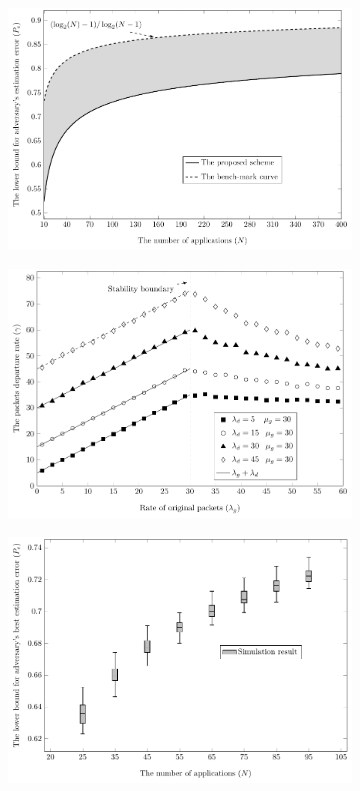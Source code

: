\documentclass{CSICC}
\begin{document}
\begin{figure}
\centering
\begin{subfigure}[b]{0.31\textwidth}
\includegraphics[width=\linewidth]{./Images/famk}
\caption{}
\label{fig:gull}
\end{subfigure}
\begin{subfigure}[b]{0.31\textwidth}
\includegraphics[width=\linewidth]{./Images/saml}
\caption{}
\label{fig:tiger}
\end{subfigure}
\begin{subfigure}[b]{0.31\textwidth}
\includegraphics[width=\linewidth]{./Images/EntropyVersus}

\end{subfigure}
\end{figure}
\end{document}
